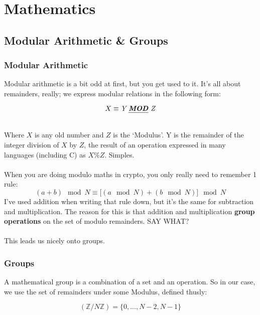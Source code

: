 
\chapter{Mathematics}
    \section{Modular Arithmetic \& Groups}
    \subsection{Modular Arithmetic}
    Modular arithmetic is a bit odd at first, but you get used to it. It's all about remainders, really; we express modular relations in the following form:\\
    \begin{figure}[htp!]
    \centering
        $$
        X \equiv \textit{Y \emph{\textbf{MOD}} Z}
        $$
    \end{figure}\\
    
    Where $X$ is any old number and $Z$ is the `Modulus'. Y is the remainder of the integer division of $X$ by $Z$, the result of an operation expressed in many languages (including C) as $X \% Z$. Simples.\\
    \\
    When you are doing modulo maths in crypto, you only really need to remember 1 rule:
    $$(a+b) \mod N \equiv \big[(a \mod N) + (b \mod N)\big] \mod N$$
    I've used addition when writing that rule down, but it's the same for subtraction and multiplication. The reason for this is that addition and multiplication \textbf{group operations} on the set of modulo remainders. SAY WHAT?\\
    \\
    This leads us nicely onto groups.

    \subsection{Groups}
    A mathematical group is a combination of a set and an operation. So in our case, we use the set of remainders under some Modulus, defined thusly:\\
    \begin{figure}[htp!]
    $$
        (\mathbb{Z}/N\mathbb{Z}) = \{0,..., N - 2, N - 1 \}
    $$
    \end{figure}\\

